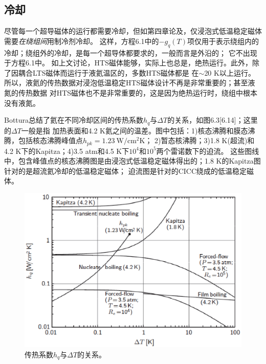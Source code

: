 \subsection{冷却}
尽管每一个超导磁体的运行都需要冷却，但如第四章论及，仅浸泡式低温稳定磁体需要\emph{在绕组间}用制冷剂冷却。
这样，方程6.1中的$-g_q(T)$项仅用于表示绕组内的冷却；绕组外的冷却，是每一个超导体都要求的，一般而言是外沿的；
它不出现于方程6.1中。
如上文讨论，HTS磁体能够，实际上也总是，绝热运行。此外，除了因耦合LTS磁体而运行于液氦温区的，多数HTS磁体都是
在$\sim$20 K以上运行。所以，液氦的传热数据对浸泡低温稳定HTS磁体设计不再是非常重要的；甚至液氮的传热数据
对HTS磁体也不是非常重要的，这是因为绝热运行时，绕组中根本没有液氮。

Bottura总结了氦在不同冷却区间的传热系数$h_q$与$\Delta T$的关系，如图6.3[6.14]；这里的$\Delta T$一般是指
加热表面和4.2 K氦之间的温差。图中包括：1)核态沸腾和膜态沸腾，包括核态沸腾峰值点$h_{pk}=1.23\ \mathrm{W/cm^2 K}$；
2)暂态核沸腾；3)1.8 K(超流)和4.2 K下的Kapitza；4)3.5 atm和4.5 K下$10^4$和$10^5$两个雷诺数下的迫流。
这些图线中，包含峰值点的核态沸腾图是由浸泡式低温稳定磁体得出的；1.8 K的Kapitza图针对的是超流氦冷却的低温稳定磁体；
迫流图是针对的CICC绕成的低温稳定磁体。
\begin{figure}[htbp]
	\centering
	\includegraphics[scale=0.7]{chpt6/figs/fig6.3.eps}
	\caption{传热系数$h_q$与$\Delta T$的关系。}
\end{figure}

